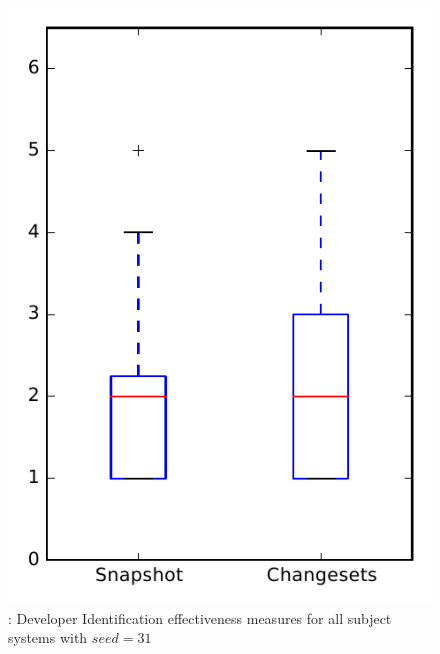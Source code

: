 
\begin{figure}
\centering
\includegraphics[height=0.4\textheight]{figures/dit_seed/rq1_overview_31}
\caption{\rtwo: Developer Identification effectiveness measures for all subject systems with $seed=31$}
\label{fig:dit_seed:rq1:overview}
\end{figure}
